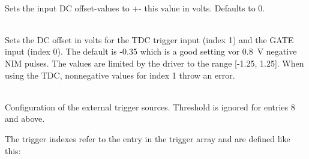 			\\
			Sets the input DC offset-values to +- this value in volts. Defaults to 0.\par

			\\
			Sets the DC offset in volts for the TDC trigger input (index 1) and the GATE input (index 0). The default is -0.35 which is a good setting vor \SI{0.8}{\volt} negative NIM pulses.
			The values are limited by the driver to the range [-1.25, 1.25]. When using the TDC, nonnegative values for index 1 throw an error. \par

			\\
			Configuration of the external trigger sources. Threshold is ignored for entries 8 and above.\par
			
			The trigger indexes refer to the entry in the trigger array and are defined like this:\par

			\\
			\\
			\\
			\\
			\\
			\\
			\\
			\\
			\\
			\\
			\\
			\\
			\\
			\\
			\par
			
			\\
			\par
			
